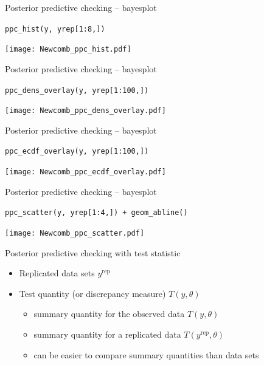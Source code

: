 \documentclass[t]{beamer}
\DeclareMathOperator{\rep}{\mathrm{rep}}
\begin{document}
\begin{frame}{Posterior predictive checking -- bayesplot}

  \vspace{-1\baselineskip}
  \texttt{ppc\_hist(y, yrep[1:8,])}
  
  \texttt{[image: Newcomb\_ppc\_hist.pdf]}

\end{frame}

\begin{frame}{Posterior predictive checking -- bayesplot}

  \vspace{-1\baselineskip}
  \texttt{ppc\_dens\_overlay(y, yrep[1:100,])}
  
  \texttt{[image: Newcomb\_ppc\_dens\_overlay.pdf]}

\end{frame}

\begin{frame}{Posterior predictive checking -- bayesplot}

  \vspace{-1\baselineskip}
  \texttt{ppc\_ecdf\_overlay(y, yrep[1:100,])}
  
  \texttt{[image: Newcomb\_ppc\_ecdf\_overlay.pdf]}

\end{frame}

\begin{frame}{Posterior predictive checking -- bayesplot}

  \vspace{-1\baselineskip}
  \texttt{ppc\_scatter(y, yrep[1:4,]) + geom\_abline()}
  
  \texttt{[image: Newcomb\_ppc\_scatter.pdf]}

\end{frame}

\begin{frame}{Posterior predictive checking with test statistic}

  \begin{itemize}
  \item Replicated data sets $y^{\rep}$
  \item Test quantity (or discrepancy measure) $T(y,\theta)$
    \begin{itemize}
    \item summary quantity for the observed data $T(y,\theta)$
    \item summary quantity for a replicated data $T(y^{\rep},\theta)$
    \item can be easier to compare summary quantities than data sets
    \end{itemize}
  \end{itemize}

\end{frame}
\end{document}
